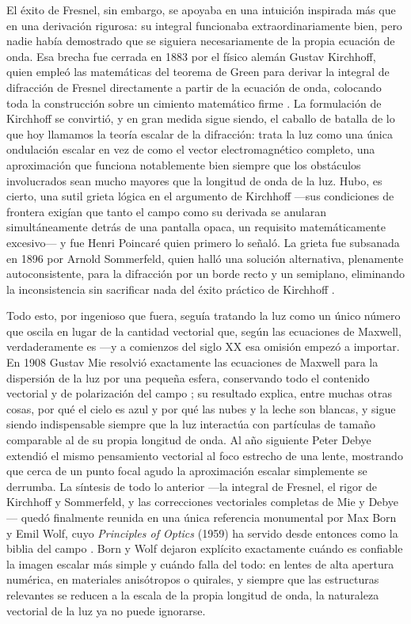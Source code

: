 	El éxito de Fresnel, sin embargo, se apoyaba en una intuición inspirada más que en una derivación rigurosa: su integral funcionaba extraordinariamente bien, pero nadie había demostrado que se siguiera necesariamente de la propia ecuación de onda. Esa brecha fue cerrada en 1883 por el físico alemán Gustav Kirchhoff, quien empleó las matemáticas del teorema de Green para derivar la integral de difracción de Fresnel directamente a partir de la ecuación de onda, colocando toda la construcción sobre un cimiento matemático firme \cite{kirchhoff1883theorie}. La formulación de Kirchhoff se convirtió, y en gran medida sigue siendo, el caballo de batalla de lo que hoy llamamos la teoría escalar de la difracción: trata la luz como una única ondulación escalar en vez de como el vector electromagnético completo, una aproximación que funciona notablemente bien siempre que los obstáculos involucrados sean mucho mayores que la longitud de onda de la luz. Hubo, es cierto, una sutil grieta lógica en el argumento de Kirchhoff —sus condiciones de frontera exigían que tanto el campo como su derivada se anularan simultáneamente detrás de una pantalla opaca, un requisito matemáticamente excesivo— y fue Henri Poincaré quien primero lo señaló. La grieta fue subsanada en 1896 por Arnold Sommerfeld, quien halló una solución alternativa, plenamente autoconsistente, para la difracción por un borde recto y un semiplano, eliminando la inconsistencia sin sacrificar nada del éxito práctico de Kirchhoff \cite{sommerfeld1896mathematische, sommerfeld1954optics}.

	Todo esto, por ingenioso que fuera, seguía tratando la luz como un único número que oscila en lugar de la cantidad vectorial que, según las ecuaciones de Maxwell, verdaderamente es —y a comienzos del siglo XX esa omisión empezó a importar. En 1908 Gustav Mie resolvió exactamente las ecuaciones de Maxwell para la dispersión de la luz por una pequeña esfera, conservando todo el contenido vectorial y de polarización del campo \cite{mie1908beitrage}; su resultado explica, entre muchas otras cosas, por qué el cielo es azul y por qué las nubes y la leche son blancas, y sigue siendo indispensable siempre que la luz interactúa con partículas de tamaño comparable al de su propia longitud de onda. Al año siguiente Peter Debye extendió el mismo pensamiento vectorial al foco estrecho de una lente, mostrando que cerca de un punto focal agudo la aproximación escalar simplemente se derrumba. La síntesis de todo lo anterior —la integral de Fresnel, el rigor de Kirchhoff y Sommerfeld, y las correcciones vectoriales completas de Mie y Debye— quedó finalmente reunida en una única referencia monumental por Max Born y Emil Wolf, cuyo \textit{Principles of Optics} (1959) ha servido desde entonces como la biblia del campo \cite{born1999principles}. Born y Wolf dejaron explícito exactamente cuándo es confiable la imagen escalar más simple y cuándo falla del todo: en lentes de alta apertura numérica, en materiales anisótropos o quirales, y siempre que las estructuras relevantes se reducen a la escala de la propia longitud de onda, la naturaleza vectorial de la luz ya no puede ignorarse.

